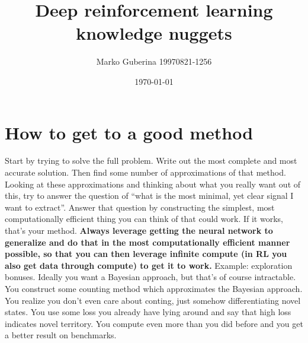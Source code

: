 \documentclass{article}
\title{Deep reinforcement learning knowledge nuggets}
\date{\today}
\author{Marko Guberina 19970821-1256}
\begin{document}
\maketitle
\section{How to get to a good method}
Start by trying to solve the full problem.
Write out the most complete and most accurate solution.
Then find some number of approximations of that method.
Looking at these approximations and thinking about what you really want out of this,
try to answer the question of ``what is the most minimal, yet clear signal I want to extract''.
Answer that question by constructing the simplest,
most computationally efficient thing you can think of that could work.
If it works, that's your method. 
\textbf{Always leverage getting the neural network to generalize and do that in the most computationally efficient
manner possible, so that you can then leverage infinite compute (in RL you also get data through compute) to get it to work.}
Example: exploration bonuses.
Ideally you want a Bayesian approach, but that's of course intractable.
You construct some counting method which approximates the Bayesian approach.
You realize you don't even care about conting, just somehow differentiating novel states.
You use some loss you already have lying around and say that high loss indicates novel territory.
You compute even more than you did before and you get a better result on benchmarks.
\end{document}
